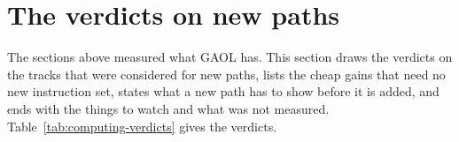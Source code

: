 \documentclass[12pt,a4paper,twoside,openright]{book}
\begin{document}
\section{The verdicts on new paths}
\label{sec:new-paths}
%

The sections above measured what GAOL has. This section draws the verdicts
on the tracks that were considered for new paths, lists the cheap gains
that need no new instruction set, states what a new path has to show
before it is added, and ends with the things to watch and what was not
measured. Table~\ref{tab:computing-verdicts} gives the verdicts.
\end{document}
